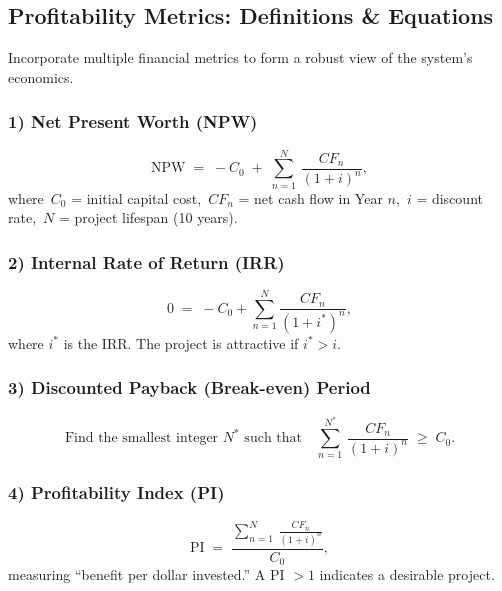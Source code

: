 \documentclass[12pt]{article}
\begin{document}
\vspace{1em}

\subsection*{Profitability Metrics: Definitions \& Equations}
Incorporate multiple financial metrics to form a robust view of the system’s economics.

\subsubsection*{1) Net Present Worth (NPW)}
\begin{equation}
    \text{NPW} \;=\; -C_0 \;+\; \sum_{n=1}^{N}\,\frac{CF_n}{(1+i)^n},
    \tag{Eq.~A1}
\end{equation}
\noindent where 
\(\,C_0\) = initial capital cost,
\(\,CF_n\) = net cash flow in Year \(n\),
\(\,i\) = discount rate,
\(\,N\) = project lifespan (10 years).

\subsubsection*{2) Internal Rate of Return (IRR)}
\begin{equation}
    0 \;=\; -C_0 + \sum_{n=1}^{N} \frac{CF_n}{(1 + i^*)^n},
    \tag{Eq.~A2}
\end{equation}
\noindent where \(i^*\) is the IRR. The project is attractive if \(i^* > i\).

\subsubsection*{3) Discounted Payback (Break-even) Period}
\begin{equation}
    \text{Find the smallest integer }N^*\text{ such that} \quad
    \sum_{n=1}^{N^*}\,\frac{CF_n}{(1+i)^n} \;\ge\; C_0.
    \tag{Eq.~A3}
\end{equation}

\subsubsection*{4) Profitability Index (PI)}
\begin{equation}
    \text{PI} \;=\; \frac{\sum_{n=1}^{N}\,\frac{CF_n}{(1+i)^n}}{C_0},
    \tag{Eq.~A4}
\end{equation}
\noindent measuring “benefit per dollar invested.” A PI $>1$ indicates a desirable project.
\end{document}
